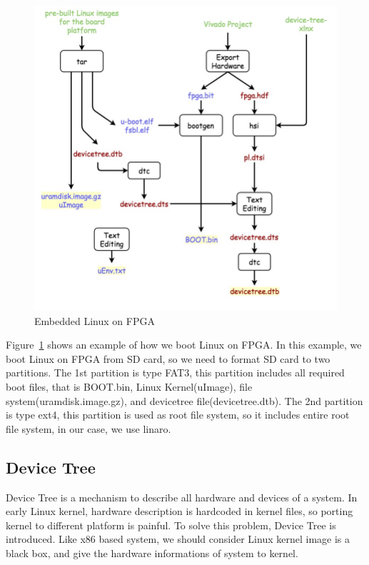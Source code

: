 \begin{figure}[!htb]
  \centering
  \includegraphics[scale=0.5]{images/embedded_linux.jpg}
  \caption[Embedded Linux on FPGA]{Embedded Linux on FPGA}
  \label{fig:Embedded Linux on FPGA}
\end{figure}

Figure~\ref{fig:Embedded Linux on FPGA} shows an example of how we boot Linux on FPGA\cite{concise}. In this example, we boot Linux on FPGA from SD card, so we need to format SD card to two partitions. The 1st partition is type FAT3, this partition includes all required boot files, that is BOOT.bin, Linux Kernel(uImage), file system(uramdisk.image.gz), and devicetree file(devicetree.dtb). The 2nd partition is type ext4, this partition is used as root file system, so it includes entire root file system, in our case, we use linaro. 

\subsection{Device Tree}
\label{subsec:Device Tree}

Device Tree is a mechanism to describe all hardware and devices of a system. In early Linux 
kernel, hardware description is hardcoded in kernel files, so porting kernel to different
platform is painful. To solve this problem, Device Tree is introduced. 
Like x86 based system, we should consider Linux kernel image is a black box, and give the 
hardware informations of system to kernel.
%

